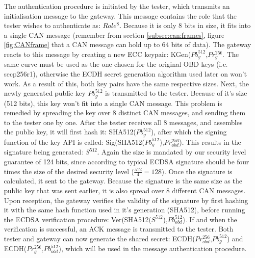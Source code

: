 The authentication procedure is initiated by the tester, which transmits an initialisation message to the gateway. This message contains the role that the tester wishes to authenticate as: $Role^8$. Because it is only 8 bits in size, it fits into a single CAN message (remember from section \ref{subsec:can:frames}, figure \ref{fig:CANframe} that a CAN message can hold up to 64 bits of data). The gateway reacts to this message by creating a new ECC keypair: KGen($Pb_g^{512}$,$Pr_g^{256}$. The same curve must be used as the one chosen for the original OBD keys (i.e. secp256r1), otherwise the ECDH secret generation algorithm used later on won't work. As a result of this, both key pairs have the same respective sizes. Next, the newly generated public key $Pb_g^{512}$ is transmitted to the tester. Because of it's size (512 bits), this key won't fit into a single CAN message. This problem is remedied by spreading the key over 8 distinct CAN messages, and sending them to the tester one by one. After the tester receives all 8 messages, and assembles the public key, it will first hash it: SHA512($Pb_g^{512}$), after which the signing function of the key API is called: Sig(SHA512($Pb_g^{512}$),$Pr_{obd}^{256}$). This results in the signature being generated: $S^{512}$. Again the size is mandated by our security level guarantee of 124 bits, since according to \cite{wiki:ECDSA} typical ECDSA signature should be four times the size of the desired security level ($\frac{512}{4}=128$). Once the signature is calculated, it sent to the gateway. Because the signature is the same size as the public key that was sent earlier, it is also spread over 8 different CAN messages. Upon reception, the gateway verifies the validity of the signature by first hashing it with the same hash function used in it's generation (SHA512), before running the ECDSA verification procedure: Ver(SHA512($S^{512}$),$Pb_{obd}^{512}$). If and when the verification is successful, an ACK message is transmitted to the tester. Both tester and gateway can now generate the shared secret: ECDH($Pr_{obd}^{256}$,$Pb_g^{512}$) and ECDH($Pr_g^{256}$,$Pb_{obd}^{512}$), which will be used in the message authentication procedure.

